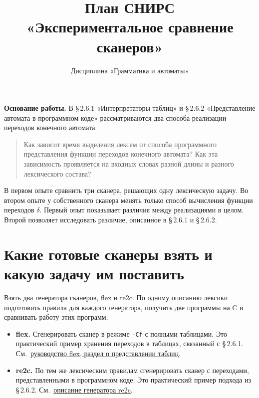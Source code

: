 \documentclass[12pt,a4paper]{article}
\title{План СНИРС\\«Экспериментальное сравнение сканеров»}
\author{Дисциплина «Грамматика и автоматы»}
\date{}
\newcommand{\parag}[1]{\S\,#1}
\newcommand{\code}[1]{\texttt{#1}}
\begin{document}
\maketitle
\raggedright

\noindent\textbf{Основание работы.} В \parag{2.6.1} «Интерпретаторы таблиц» и \parag{2.6.2} «Представление автомата в программном коде» рассматриваются два способа реализации переходов конечного автомата.

\begin{quote}
Как зависит время выделения лексем от способа программного представления функции переходов конечного автомата? Как эта зависимость проявляется на входных словах разной длины и разного лексического состава?
\end{quote}

В первом опыте сравнить три сканера, решающих одну лексическую задачу. Во втором опыте у собственного сканера менять только способ вычисления функции переходов $\delta$. Первый опыт показывает различия между реализациями в целом. Второй позволяет исследовать различие, описанное в \parag{2.6.1} и \parag{2.6.2}.

\section{Какие готовые сканеры взять и какую задачу им поставить}

Взять два генератора сканеров, flex и re2c. По одному описанию лексики подготовить правила для каждого генератора, получить две программы на C и сравнивать работу этих программ.
\begin{itemize}
\item \textbf{flex.} Сгенерировать сканер в режиме \code{-Cf} с полными таблицами. Это практический пример хранения переходов в таблицах, связанный с \parag{2.6.1}. См.\ \href{https://westes.github.io/flex/manual/Options-for-Scanner-Speed-and-Size.html}{руководство flex, раздел о представлении таблиц}.
\item \textbf{re2c.} По тем же лексическим правилам сгенерировать сканер с переходами, представленными в программном коде. Это практический пример подхода из \parag{2.6.2}. См.\ \href{https://re2c.org/}{описание генератора re2c}.
\end{itemize}
\end{document}
